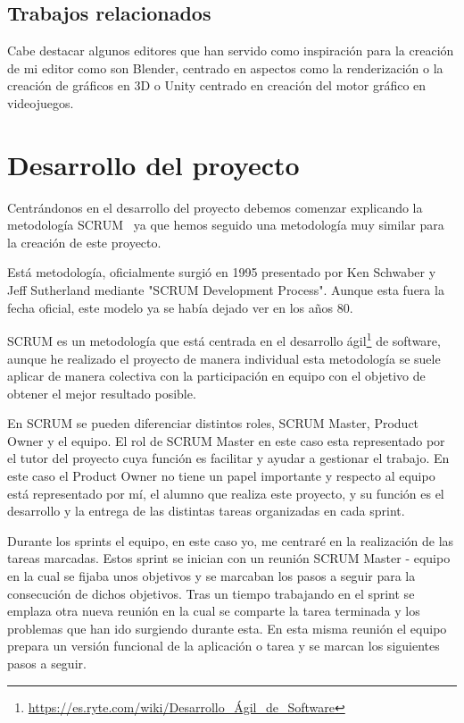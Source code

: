 \documentclass[a4paper, 12pt]{book}
\begin{document}
\section{Trabajos relacionados} %
\label{sec:Otros}
Cabe destacar algunos editores que han servido como inspiración para la creación de mi editor como son Blender, centrado en aspectos como la renderización o la creación de gráficos en 3D o Unity centrado en creación del motor gráfico en videojuegos. 


\cleardoublepage
\chapter{Desarrollo del proyecto}
\label{chap:Desarrollo del proyecto}
Centrándonos en el desarrollo del proyecto debemos comenzar explicando la metodología SCRUM~\cite{proyectos} ya que hemos seguido una metodología muy similar para la creación de este proyecto.

Está metodología, oficialmente surgió en 1995 presentado por Ken Schwaber y Jeff Sutherland mediante "SCRUM Development Process". Aunque esta fuera la fecha oficial, este modelo ya se había dejado ver en los años 80.

SCRUM es un metodología que está centrada en el desarrollo ágil\footnote{\url{https://es.ryte.com/wiki/Desarrollo_Ágil_de_Software}}  de software, aunque he realizado el proyecto de manera individual esta metodología se suele aplicar de manera colectiva con la participación en equipo con el objetivo de obtener el mejor resultado posible.

En SCRUM se pueden diferenciar distintos roles, SCRUM Master, Product Owner y el equipo. El rol de SCRUM Master en este caso esta representado por el tutor del proyecto cuya función es facilitar y ayudar a gestionar el trabajo. En este caso el Product Owner no tiene un papel importante y respecto al equipo está representado por mí, el alumno que realiza este proyecto, y su función es el desarrollo y la entrega de las distintas tareas organizadas en cada sprint.

Durante los sprints el equipo, en este caso yo, me centraré en la realización de las tareas marcadas. Estos sprint se inician con un reunión SCRUM Master - equipo en la cual se fijaba unos objetivos y se marcaban los pasos a seguir para la consecución de dichos objetivos. Tras un tiempo trabajando en el sprint se emplaza otra nueva reunión en la cual se comparte la tarea terminada y los problemas que han ido surgiendo durante esta. En esta misma reunión el equipo prepara un versión funcional de la aplicación o tarea y se marcan los siguientes pasos a seguir. 
\end{document}
